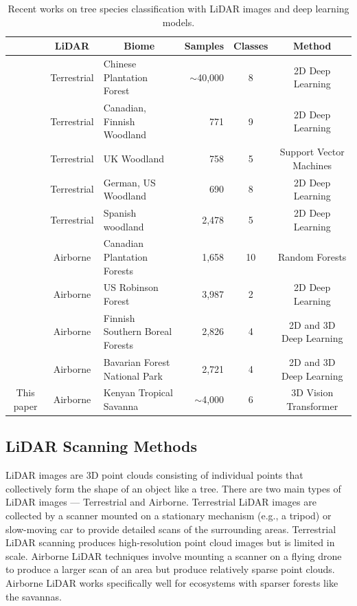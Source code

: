 \documentclass[letterpaper]{article} %
\begin{document}
\begin{table}[t]
\centering
\begin{tabular}{cclrcc}\toprule
     & \multicolumn{1}{c}{LiDAR} & \multicolumn{1}{c}{Biome} & \multicolumn{1}{c}{Samples} & \multicolumn{1}{c}{Classes} & \multicolumn{1}{c}{Method} \\ \midrule
    \citealt{zou2017tree} & Terrestrial & Chinese Plantation Forest & $\sim$40,000 & 8 & 2D Deep Learning\\
    \citealt{xi2020see} & Terrestrial & Canadian, Finnish Woodland & 771 & 9 & 2D Deep Learning\\
    \citealt{terryn2020tree} & Terrestrial & UK Woodland & 758 & 5 & Support Vector Machines\\
    \citealt{seidel2021predicting} & Terrestrial & German, US Woodland & 690 & 8 & 2D Deep Learning\\
    \citealt{allen} & Terrestrial & Spanish woodland & 2,478 & 5 & 2D Deep Learning\\
    \citealt{BUDEI2018632} & Airborne & Canadian Plantation Forests & 1,658 & 10 & Random Forests \\
    \citealt{HAMRAZ2019219} & Airborne & US Robinson Forest & 3,987 & 2 & 2D Deep Learning \\
    \citealt{MAYRA2021112322} & Airborne & Finnish Southern Boreal Forests & 2,826 & 4 & 2D and 3D Deep Learning \\
    \citealt{Hell2022} & Airborne & Bavarian Forest National Park & 2,721 & 4 & 2D and 3D Deep Learning \\
    This paper & Airborne & Kenyan Tropical Savanna & $\sim$4,000 & 6 & 3D Vision Transformer \\ \bottomrule
\end{tabular}
\caption{Recent works on tree species classification with LiDAR images and deep learning models.}
\label{table:prevwork}
\end{table}

\subsection{LiDAR Scanning Methods}

LiDAR images are 3D point clouds consisting of individual points that collectively form the shape of an object like a tree. There are two main types of LiDAR images — Terrestrial and Airborne. Terrestrial LiDAR images are collected by a scanner mounted on a stationary mechanism (e.g., a tripod) or slow-moving car to provide detailed scans of the surrounding areas. Terrestrial LiDAR scanning produces high-resolution point cloud images but is limited in scale. Airborne LiDAR techniques involve mounting a scanner on a flying drone to produce a larger scan of an area but produce relatively sparse point clouds. Airborne LiDAR works specifically well for ecosystems with sparser forests like the savannas. 
\end{document}
